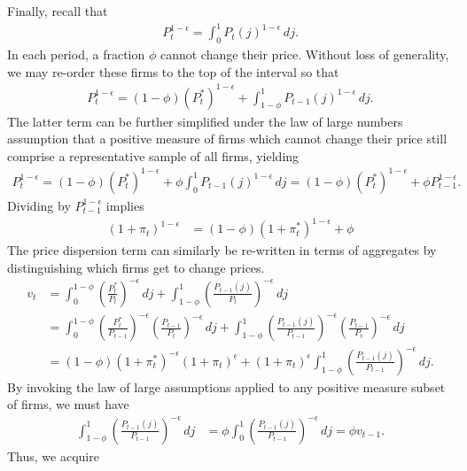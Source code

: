 \documentclass[12 pt, oneside]{article}
\theoremstyle{definition}
\theoremstyle{definition}
\theoremstyle{definition}
\begin{document}
Finally, recall that
\begin{align*}
  P_t^{1 - \epsilon} = \int_0^1 P_t(j)^{1 - \epsilon}\, dj.
\end{align*}
In each period, a fraction $\phi$ cannot change their price. Without loss of generality, we may re-order these firms to the top of the interval so that
\begin{align*}
  P_t^{1 - \epsilon} = (1 - \phi)(P_t^*)^{1 - \epsilon} +  \int_{1 - \phi}^1 P_{t - 1}(j)^{1 - \epsilon}\, dj.
\end{align*}
The latter term can be further simplified under the law of large numbers assumption that a positive measure of firms  which cannot change their price
still comprise a representative sample of all firms, yielding
\begin{align*}
  P_t^{1 - \epsilon} = (1 - \phi)(P_t^*)^{1 - \epsilon} +  \phi\int_0^1 P_{t - 1}(j)^{1 - \epsilon}\, dj = (1 - \phi)(P_t^*)^{1 - \epsilon} +  \phi P_{t - 1}^{1 - \epsilon}.
\end{align*}
Dividing by $P_{t - 1}^{1 - \epsilon}$ implies
\begin{align*}
  (1 + \pi_t)^{ 1 - \epsilon} & = (1 - \phi) (1 + \pi_t^*)^{1 - \epsilon} + \phi
\end{align*}
The price dispersion term can similarly be re-written in terms of aggregates by distinguishing which firms get to change prices.
\begin{align*}
  v_t & = \int_0^{1 - \phi}\left(\frac{P_t^*}{P_t}\right)^{ - \epsilon}\, dj + \int_{1 - \phi}^1 \left(\frac{P_{t - 1}(j)}{P_t}\right)^{ - \epsilon}\, dj\\
      & = \int_0^{1 - \phi}\left(\frac{P_t^*}{P_{t - 1}}\right)^{ - \epsilon}\left(\frac{P_{t - 1}}{P_t}\right)^{ - \epsilon}\, dj + \int_{1 - \phi}^1 \left(\frac{P_{t - 1}(j)}{P_{t - 1}}\right)^{ - \epsilon}\left(\frac{P_{t - 1}}{P_t}\right)^{ - \epsilon}\, dj\\
      & = (1 - \phi) ( 1  + \pi_t^*)^{-\epsilon} ( 1 + \pi_t)^{\epsilon}  +(1 + \pi_t)^{\epsilon} \int_{1 - \phi}^1 \left(\frac{P_{t - 1}(j)}{P_{t - 1}}\right)^{ - \epsilon}\,dj.
\end{align*}
By invoking the law of large assumptions applied to any positive measure subset of firms, we must have
\begin{align*}
  \int_{1 - \phi}^1 \left(\frac{P_{t - 1}(j)}{P_{t - 1}}\right)^{ - \epsilon}\,dj & = \phi\int_0^1 \left(\frac{P_{t - 1}(j)}{P_{t - 1}}\right)^{ - \epsilon}\,dj = \phi v_{t - 1}.
\end{align*}
Thus, we acquire
\end{document}
